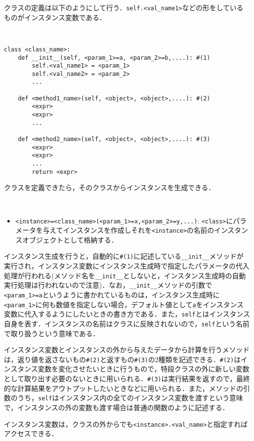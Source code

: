 クラスの定義は以下のようにして行う．\texttt{self.<val\_name1>}などの形をしているものがインスタンス変数である．
\begin{gram}[クラスの定義]　
\begin{lstlisting}
class <class_name>:
	def __init__(self, <param_1>=a, <param_2>=b,....): #(1)
		self.<val_name1> = <param_1>
		self.<val_name2> = <param_2>
		...
	
	def <method1_name>(self, <object>, <object>,....): #(2)
		<expr>
		<expr>
		...
	
	def <method2_name>(self, <object>, <object>,....): #(3)
		<expr>
		<expr>
		...
		return <expr>
\end{lstlisting}
\end{gram}
クラスを定義できたら，そのクラスからインスタンスを生成できる．
\begin{gram}[インスタンスの生成]　
\begin{itemize}
\item \texttt{<instance>=<class\_name>(<param\_1>=x,<param\_2>=y,...)}: \texttt{<class>}にパラメータを与えてインスタンスを作成しそれを\texttt{<instance>}の名前のインスタンスオブジェクトとして格納する．
\end{itemize}
\end{gram}
インスタンス生成を行うと，自動的に\texttt{\#(1)}に記述している\texttt{\_\_init\_\_}メソッドが実行され，インスタンス変数にインスタンス生成時で指定したパラメータの代入処理が行われる(メソッド名を\texttt{\_\_init\_\_}としないと，インスタンス生成時の自動実行処理は行われないので注意)．なお，\texttt{\_\_init\_\_}メソッドの引数で\texttt{<param\_1>=a}というように書かれているものは，インスタンス生成時に\texttt{<param\_1>}に何も数値を指定しない場合，デフォルト値として\texttt{a}をインスタンス変数に代入するようにしたいときの書き方である．また，\texttt{self}とはインスタンス自身を表す．インスタンスの名前はクラスに反映されないので，\texttt{self}という名前で取り扱うという意味である．

インスタンス変数とインスタンスの外から与えたデータから計算を行うメソッドは，返り値を返さないもの\texttt{\#(2)}と返すもの\texttt{\#(3)}の2種類を記述できる．\texttt{\#(2)}はインスタンス変数を変化させたいときに行うもので，特段クラスの外に新しい変数として取り出す必要のないときに用いられる．\texttt{\#(3)}は実行結果を返すので，最終的な計算結果をアウトプットしたいときなどに用いられる．また，メソッドの引数のうち，\texttt{self}はインスタンス内の全てのインスタンス変数を渡すという意味で，インスタンスの外の変数も渡す場合は普通の関数のように記述する．

インスタンス変数は，クラスの外からでも\texttt{<instance>.<val\_name>}と指定すればアクセスできる．

